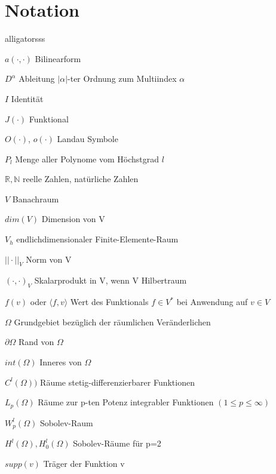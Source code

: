\documentclass[12pt,a4paper]{scrartcl}
\numberwithin{equation}{section}
\begin{document}

\newpage
\tableofcontents


 


\newpage
\setcounter{page}{1}
\section*{Notation}

\begin{labeling}{alligatorsss \quad \quad }
\item [$a(\cdot,\cdot)$] Bilinearform
\item [$D^{\alpha}$] Ableitung $|\alpha|$-ter Ordnung zum Multiindex $\alpha$
\item [$I$] Identität
\item [$J(\cdot)$] Funktional
\item [$O(\cdot)$, $o(\cdot)$] Landau Symbole
\item [$P_l$] Menge aller Polynome vom Höchstgrad $l$
\item [$\mathbb{R},\mathbb{N}$] reelle Zahlen, natürliche Zahlen
\item [$V$] Banachraum
\item [$dim(V)$] Dimension von V
\item [$V_h$] endlichdimensionaler Finite-Elemente-Raum
\item [$||\cdot||_V$] Norm von V
\item [$(\cdot,\cdot)_V$] Skalarprodukt in V, wenn V Hilbertraum
\item [$f(v)$ oder $\langle f , v \rangle$] Wert des Funktionals $f \in V^{*}$ bei Anwendung auf $v \in V$
\item [$\Omega$] Grundgebiet bezüglich der räumlichen Veränderlichen
\item [$\partial \Omega$] Rand von $\Omega$
\item [$int( \Omega)$] Inneres von $\Omega$
\item [$C^{l}(\Omega))$] Räume stetig-differenzierbarer Funktionen
\item [$L_p(\Omega)$] Räume zur p-ten Potenz integrabler Funktionen $(1 \leq p \leq \infty)$
\item [$W_p^l(\Omega)$] Sobolev-Raum
\item [$H^l(\Omega),H_0^l(\Omega)$] Sobolev-Räume für p=2
\item [$supp(v)$] Träger der Funktion v

\end{labeling}
\end{document}
